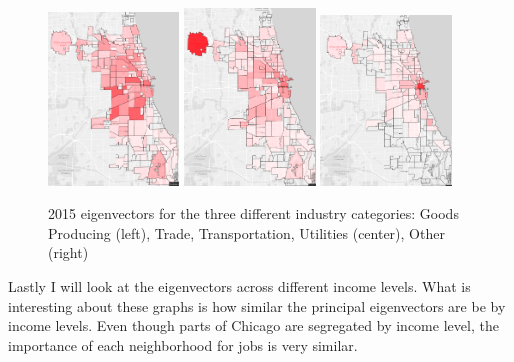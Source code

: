 \documentclass{article}
\theoremstyle{definition}
\theoremstyle{remark}
\begin{document}
\begin{figure}[H]
    \centering
    \includegraphics[width=0.31\textwidth]{Jobs-SI001-2015}
    \includegraphics[width=0.31\textwidth]{Jobs-SI002-2015}
    \includegraphics[width=0.31\textwidth]{Jobs-SI003-2015}
    \caption{2015 eigenvectors for the three different industry categories: Goods Producing (left), Trade, Transportation, Utilities (center), Other (right)}
    \label{fig:Jobs-S000-2008}
\end{figure}

Lastly I will look at the eigenvectors across different income levels.  What is interesting about these graphs is how similar the principal eigenvectors are be by income levels.  Even though parts of Chicago are segregated by income level, the importance of each neighborhood for jobs is very similar.
\end{document}
